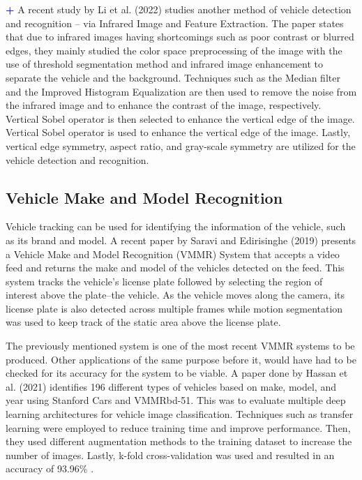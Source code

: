 	\textcolor{blue}{\textbf{+}} A recent study by Li et al. (2022) studies another method of vehicle detection and recognition – via Infrared Image and Feature Extraction. The paper states that due to infrared images having shortcomings such as poor contrast or blurred edges, they mainly studied the color space preprocessing of the image with the use of threshold segmentation method and infrared image enhancement to separate the vehicle and the background. Techniques such as the Median filter and the Improved Histogram Equalization are then used to remove the noise from the infrared image and to enhance the contrast of the image, respectively. Vertical Sobel operator is then selected to enhance the vertical edge of the image. Vertical Sobel operator is used to enhance the vertical edge of the image. Lastly, vertical edge symmetry, aspect ratio, and gray-scale symmetry are utilized for the vehicle detection and recognition.


\subsection { Vehicle Make and Model Recognition}

	Vehicle tracking can be used for identifying the information of the vehicle, such as its brand and model. A recent paper by Saravi and Edirisinghe (2019) presents a Vehicle Make and Model Recognition (VMMR) System that accepts a video feed and returns the make and model of the vehicles detected on the feed. This system tracks the vehicle’s license plate followed by selecting the region of interest above the plate–the vehicle. As the vehicle moves along the camera, its license plate is also detected across multiple frames while motion segmentation was used to keep track of the static area above the license plate.

	The previously mentioned system is one of the most recent VMMR systems to be produced. Other applications of the same purpose before it, would have had to be checked for its accuracy for the system to be viable. A paper done by Hassan et al. (2021)  identifies 196 different types of vehicles based on make, model, and year using Stanford Cars and VMMRbd-51. This was to evaluate multiple deep learning architectures for vehicle image classification. Techniques such as transfer learning were employed to reduce training time and improve performance. Then, they used different augmentation methods to the training dataset to increase the number of images. Lastly, k-fold cross-validation was used and resulted in an accuracy of 93.96\% .




